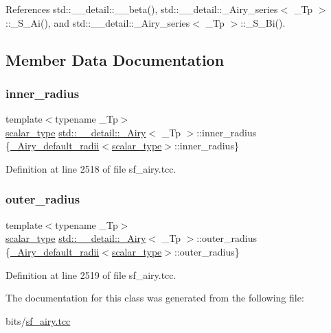 References std\+::\+\_\+\+\_\+detail\+::\+\_\+\+\_\+beta(), std\+::\+\_\+\+\_\+detail\+::\+\_\+\+Airy\+\_\+series$<$ \+\_\+\+Tp $>$\+::\+\_\+\+S\+\_\+\+Ai(), and std\+::\+\_\+\+\_\+detail\+::\+\_\+\+Airy\+\_\+series$<$ \+\_\+\+Tp $>$\+::\+\_\+\+S\+\_\+\+Bi().



\subsection{Member Data Documentation}
\mbox{\label{classstd_1_1____detail_1_1__Airy_ae619970f4c54b7f80340f05b7ead83e1}} 
\subsubsection{\texorpdfstring{inner\+\_\+radius}{inner\_radius}}
{\footnotesize\ttfamily template$<$typename \+\_\+\+Tp$>$ \\
\hyperlink{classstd_1_1____detail_1_1__Airy_a266cdfcc86b36c8743fd0e102387e1f0}{scalar\+\_\+type} \hyperlink{classstd_1_1____detail_1_1__Airy}{std\+::\+\_\+\+\_\+detail\+::\+\_\+\+Airy}$<$ \+\_\+\+Tp $>$\+::inner\+\_\+radius \{\hyperlink{structstd_1_1____detail_1_1__Airy__default__radii}{\+\_\+\+Airy\+\_\+default\+\_\+radii}$<$\hyperlink{classstd_1_1____detail_1_1__Airy_a266cdfcc86b36c8743fd0e102387e1f0}{scalar\+\_\+type}$>$\+::inner\+\_\+radius\}}



Definition at line 2518 of file sf\+\_\+airy.\+tcc.

\mbox{\label{classstd_1_1____detail_1_1__Airy_af688e5d14ed305f95f0e9d9d58d3bf9a}} 
\subsubsection{\texorpdfstring{outer\+\_\+radius}{outer\_radius}}
{\footnotesize\ttfamily template$<$typename \+\_\+\+Tp$>$ \\
\hyperlink{classstd_1_1____detail_1_1__Airy_a266cdfcc86b36c8743fd0e102387e1f0}{scalar\+\_\+type} \hyperlink{classstd_1_1____detail_1_1__Airy}{std\+::\+\_\+\+\_\+detail\+::\+\_\+\+Airy}$<$ \+\_\+\+Tp $>$\+::outer\+\_\+radius \{\hyperlink{structstd_1_1____detail_1_1__Airy__default__radii}{\+\_\+\+Airy\+\_\+default\+\_\+radii}$<$\hyperlink{classstd_1_1____detail_1_1__Airy_a266cdfcc86b36c8743fd0e102387e1f0}{scalar\+\_\+type}$>$\+::outer\+\_\+radius\}}



Definition at line 2519 of file sf\+\_\+airy.\+tcc.



The documentation for this class was generated from the following file\+:\begin{DoxyCompactItemize}
\item 
bits/\hyperlink{sf__airy_8tcc}{sf\+\_\+airy.\+tcc}\end{DoxyCompactItemize}

